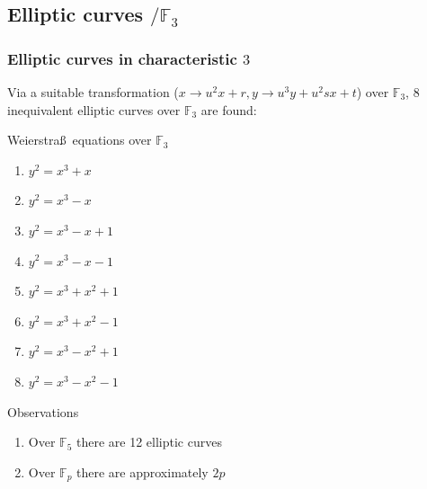 \documentclass[10pt,final]{beamer} %
\newcommand{\F}{\mathbb F}
\theoremstyle{definition}
\begin{document}
\subsection{Elliptic curves \texorpdfstring{$/\F_3$}{F3}}
\begin{frame}
\frametitle{Elliptic curves in characteristic $3$}

Via a suitable transformation ($x\rightarrow u^2x+r, y\rightarrow u^3y+u^2sx+t$) over $\F_3$,  $8$ inequivalent
elliptic curves over $\F_3$ are found:\pause

\begin{beamerboxesrounded}[upper=block title example,lower=block body alerted,shadow=true]{Weierstra\ss\ equations over $\F_3$}
\begin{enumerate}
 \item $y^2=x^3+x$
 \item$y^2=x^3 - x$
 \item$y^2=x^3 - x +1$
 \item$y^2=x^3 - x -1$
 \item$y^2=x^3 + x^2 + 1$
 \item$y^2=x^3 + x^2 - 1$
 \item$y^2=x^3 - x^2 + 1$
 \item$y^2=x^3 - x^2 - 1$
 \end{enumerate}
\end{beamerboxesrounded}\pause

\begin{block}{Observations}
\begin{enumerate}[<+-| alert@+>]
\item Over  $\F_5$ there are 12 elliptic curves
          \item Over $\F_p$ there are approximately $2p$
         \end{enumerate}
\end{block}



\end{frame}
\end{document}

